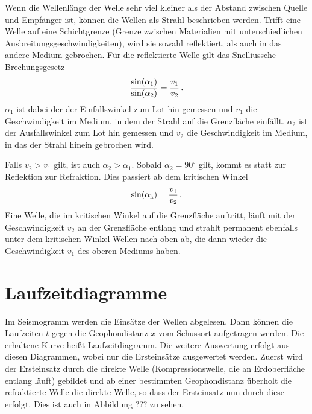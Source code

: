 Wenn die Wellenlänge der Welle sehr viel kleiner als der Abstand zwischen Quelle und Empfänger ist, können die Wellen als Strahl beschrieben werden. Trifft eine Welle auf eine Schichtgrenze (Grenze zwischen Materialien mit unterschiedlichen Ausbreitungsgeschwindigkeiten), wird sie sowahl reflektiert, als auch in das andere Medium gebrochen. Für die reflektierte Welle gilt das Snelliussche Brechungsgesetz
\begin{equation}
 \frac{\sin(\alpha_1)}{\sin(\alpha_2)}=\frac{v_1}{v_2}\text{\,.}
\end{equation}
$\alpha_1$ ist dabei der der Einfallswinkel zum Lot hin gemessen und $v_1$ die Geschwindigkeit im Medium, in dem der Strahl auf die Grenzfläche einfällt. $\alpha_2$ ist der Ausfallswinkel zum Lot hin gemessen und $v_2$ die Geschwindigkeit im Medium, in das der Strahl hinein gebrochen wird.

Falls $v_2>v_1$ gilt, ist auch $\alpha_2>\alpha_1$. Sobald $\alpha_2=90^\circ$ gilt, kommt es statt zur Reflektion zur Refraktion. Dies passiert ab dem kritischen Winkel
\begin{equation}
 \sin(\alpha_{\mathrm{k}}) =\frac{v_1}{v_2} \text{\,.}
\end{equation}
Eine Welle, die im kritischen Winkel auf die Grenzfläche auftritt, läuft mit der Geschwindigkeit $v_2$ an der Grenzfläche entlang und strahlt permanent ebenfalls unter dem kritischen Winkel Wellen nach oben ab, die dann wieder die Geschwindigkeit $v_1$ des oberen Mediums haben.

\section{Laufzeitdiagramme}

Im Seismogramm werden die Einsätze der Wellen abgelesen. Dann können die Laufzeiten $t$ gegen die Geophondistanz $x$ vom Schussort aufgetragen werden. Die erhaltene Kurve heißt Laufzeitdiagramm. Die weitere Auswertung erfolgt aus diesen Diagrammen, wobei nur die Ersteinsätze ausgewertet werden. Zuerst wird der Ersteinsatz durch die direkte Welle (Kompressionswelle, die an Erdoberfläche entlang läuft) gebildet und ab einer bestimmten Geophondistanz überholt die refraktierte Welle die direkte Welle, so dass der Ersteinsatz nun durch diese erfolgt. Dies ist auch in Abbildung ??? zu sehen.

